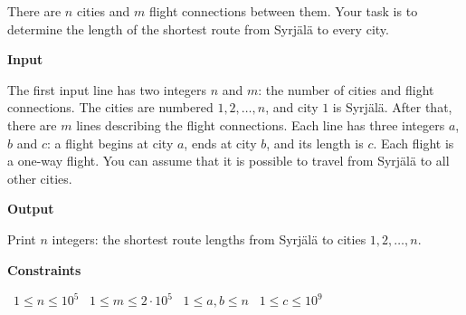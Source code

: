 There are $n$ cities and $m$ flight connections between them. Your task is to determine the length of the shortest route from Syrjälä to every city.

\vspace{0.3cm}\noindent\textbf{Input}

The first input line has two integers $n$ and $m$: the number of cities and flight connections. The cities are numbered $1,2,\dots,n$, and city $1$ is Syrjälä.
After that, there are $m$ lines describing the flight connections. Each line has three integers $a$, $b$ and $c$: a flight begins at city $a$, ends at city $b$, and its length is $c$. Each flight is a one-way flight.
You can assume that it is possible to travel from Syrjälä to all other cities.

\vspace{0.3cm}\noindent\textbf{Output}

Print $n$ integers: the shortest route lengths from Syrjälä to cities $1,2,\dots,n$.

\vspace{0.3cm}\noindent\textbf{Constraints}

\textbullet\ $1 \le n \le 10^5$
\textbullet\ $1 \le m \le 2 \cdot 10^5$
\textbullet\ $1 \le a,b \le n$
\textbullet\ $1 \le c \le 10^9$